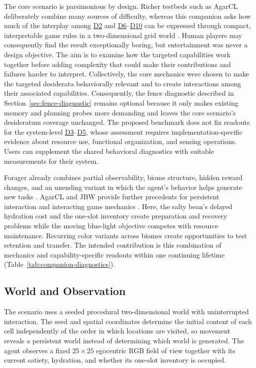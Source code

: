 \documentclass[10pt,journal,compsoc]{IEEEtran}
\DeclareRobustCommand{\Dref}[1]{\hyperref[sec:d#1]{D#1}}
\begin{document}
The core scenario is parsimonious by design.
Richer testbeds such as AgarCL deliberately combine many sources of difficulty, whereas this companion asks how much of the interplay among \Dref{2} and \Dref{6}--\Dref{10} can be expressed through compact, interpretable game rules in a two-dimensional grid world \cite{mohamed2026}.
Human players may consequently find the result exceptionally boring, but entertainment was never a design objective.
The aim is to examine how the targeted capabilities work together before adding complexity that could make their contributions and failures harder to interpret.
Collectively, the core mechanics were chosen to make the targeted desiderata behaviorally relevant and to create interactions among their associated capabilities.
Consequently, the fence diagnostic described in Section~\ref{sec:fence-diagnostic} remains optional because it only makes existing memory and planning probes more demanding and leaves the core scenario's desideratum coverage unchanged.
The proposed benchmark does not fix readouts for the system-level \Dref{3}--\Dref{5}, whose assessment requires implementation-specific evidence about resource use, functional organization, and sensing operations.
Users can supplement the shared behavioral diagnostics with suitable measurements for their system.

Forager already combines partial observability, biome structure, hidden reward changes, and an unending variant in which the agent's behavior helps generate new tasks \cite{tang2026}.
AgarCL and JBW provide further precedents for persistent interaction and interacting game mechanics \cite{platanios2020,mohamed2026}.
Here, the salty bean's delayed hydration cost and the one-slot inventory create preparation and recovery problems while the moving blue-light objective competes with resource maintenance.
Recurring color variants across biomes create opportunities to test retention and transfer.
The intended contribution is this combination of mechanics and capability-specific readouts within one continuing lifetime (Table~\ref{tab:companion-diagnostics}).

\subsection{World and Observation}

The scenario uses a seeded procedural two-dimensional world with uninterrupted interaction.
The seed and spatial coordinates determine the initial content of each cell independently of the order in which locations are visited, so movement reveals a persistent world instead of determining which world is generated.
The agent observes a fixed $25\times25$ egocentric RGB field of view together with its current satiety, hydration, and whether its one-slot inventory is occupied.
\end{document}
